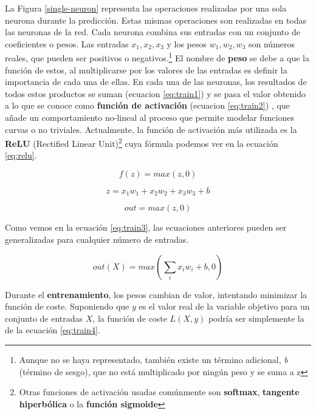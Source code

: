 \documentclass[
  12pt,
  spanish,
  a4paperpaper,
]{report}
\begin{document}
La Figura \ref{single-neuron} representa las operaciones realizadas por
una sola neurona durante la predicción. Estas mismas operaciones son
realizadas en todas las neuronas de la red. Cada neurona combina sus
entradas con un conjunto de coeficientes o pesos. Las entradas
\(x_1,x_2,x_3\) y los pesos \(w_1,w_2,w_3\) son números reales, que
pueden ser positivos o negativos.\footnote{Aunque no se haya
  representado, también existe un término adicional, \emph{b} (término
  de sesgo), que no está multiplicado por ningún peso y se suma a z} El
nombre de \textbf{peso} se debe a que la función de estos, al
multiplicarse por los valores de las entradas es definir la importancia
de cada una de ellas. En cada una de las neuronas, los resultados de
todos estos productos se suman (ecuacion \ref{eq:train1}) y se pasa el
valor obtenido a lo que se conoce como \textbf{función de activación}
(ecuacion \ref{eq:train2}) , que añade un comportamiento no-lineal al
proceso que permite modelar funciones curvas o no triviales.
Actualmente, la función de activación más utilizada es la \textbf{ReLU}
(Rectified Linear Unit)\footnote{Otras funciones de activación usadas
  comúnmente son \textbf{softmax}, \textbf{tangente hiperbólica} o la
  \textbf{función sigmoide}} cuya fórmula podemos ver en la ecuación
\ref{eq:relu}.

\begin{equation} \label{eq:relu}
f(z)=max(z,0)
\end{equation}

\begin{equation} \label{eq:train1}
 z = x_1w_1 + x_2w_2 + x_3w_3 + b
\end{equation}

\begin{equation} \label{eq:train2}
  out = max(z,0)
\end{equation}

Como vemos en la ecuación \ref{eq:train3}, las ecuaciones anteriores
pueden ser generalizadas para cualquier número de entradas.

\begin{equation} \label{eq:train3}
 out(X) = max(\sum_{i}x_iw_i+b,0)
\end{equation}

Durante el \textbf{entrenamiento}, los pesos cambian de valor,
intentando minimizar la función de coste. Suponiendo que \(y\) es el
valor real de la variable objetivo para un conjunto de entradas \(X\),
la función de coste \(L(X,y)\) podría ser simplemente la de la ecuación
\ref{eq:train4}.
\end{document}
